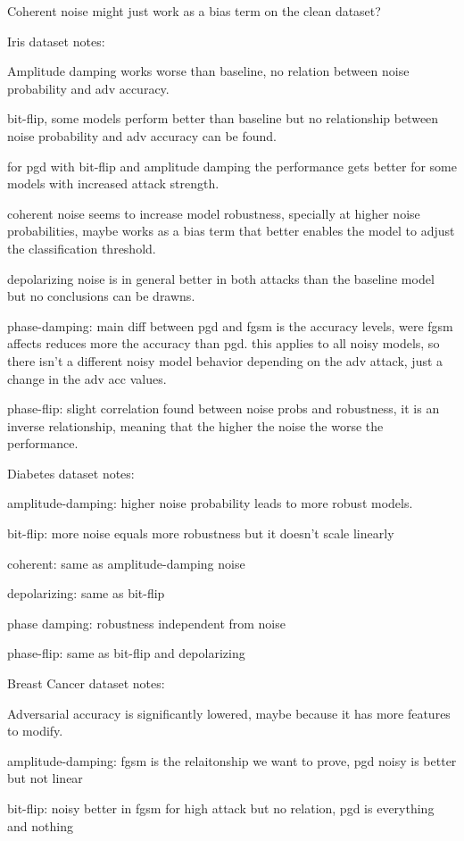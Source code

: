 Coherent noise might just work as a bias term on the clean dataset? \

Iris dataset notes: \

Amplitude damping works worse than baseline, no relation between noise
probability and adv accuracy. \

bit-flip, some models perform better than baseline but no relationship
between noise probability and adv accuracy can be found. \

for pgd with bit-flip and amplitude damping the performance gets better
for some models with increased attack strength. \

coherent noise seems to increase model robustness, specially at higher noise
probabilities, maybe works as a bias term that better enables the model
to adjust the classification threshold. \

depolarizing noise is in general better in both attacks than the baseline
model but no conclusions can be drawns. \

phase-damping: main diff between pgd and fgsm is the accuracy levels,
were fgsm affects reduces more the accuracy than pgd. this applies to
all noisy models, so there isn't a different noisy model behavior
depending on the adv attack, just a change in the adv acc values. \

phase-flip: slight correlation found between noise probs and robustness,
it is an inverse relationship, meaning that the higher the noise the worse
the performance.

Diabetes dataset notes: \

amplitude-damping: higher noise probability leads to more robust models. \

bit-flip: more noise equals more robustness but it doesn't scale linearly \

coherent: same as amplitude-damping noise \

depolarizing:  same as bit-flip \

phase damping: robustness independent from noise \

phase-flip: same as bit-flip and depolarizing \

Breast Cancer dataset notes: \

Adversarial accuracy is significantly lowered, maybe because it has
more features to modify. \

amplitude-damping: fgsm is the relaitonship we want to prove, pgd noisy is better but not linear \

bit-flip: noisy better in fgsm for high attack but no relation, pgd is everything and nothing \

